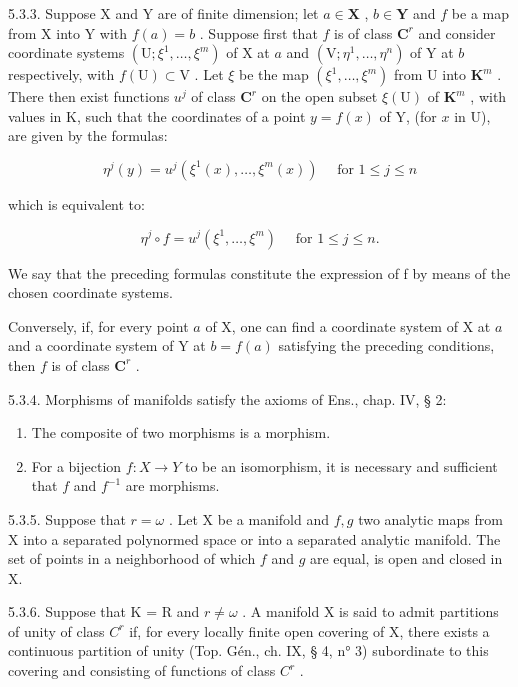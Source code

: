 5.3.3. Suppose X and Y are of finite dimension; let \(a \in \mathbf{X}\) , \(b \in \mathbf{Y}\) and \(f\) be a map from X into Y with \(f(a) = b\) . Suppose first that \(f\) is of class \(\mathbf{C}^r\) and consider coordinate systems \((\mathrm{U}; \xi^1, \ldots, \xi^m)\) of X at \(a\) and \((\mathrm{V}; \eta^1, \ldots, \eta^n)\) of Y at \(b\) respectively, with \(f(\mathrm{U}) \subset \mathrm{V}\) . Let \(\xi\) be the map \((\xi^1, \ldots, \xi^m)\) from U into \(\mathbf{K}^m\) . There then exist functions \(u^j\) of class \(\mathbf{C}^r\) on the open subset \(\xi(\mathrm{U})\) of \(\mathbf{K}^m\) , with values in K, such that the coordinates of a point \(y = f(x)\) of Y, (for \(x\) in U), are given by the formulas:

\[
\eta^ {j} (y) = u ^ {j} (\xi^ {1} (x), \dots , \xi^ {m} (x)) \quad \text { for } 1 \leqslant j \leqslant n\tag{1}
\]

which is equivalent to:

\[
\eta^ {j} \circ f = u ^ {j} (\xi^ {1}, \dots , \xi^ {m}) \quad \text { for } 1 \leqslant j \leqslant n.\tag{2}
\]

We say that the preceding formulas constitute the expression of f by means of the chosen coordinate systems.

Conversely, if, for every point \(a\) of X, one can find a coordinate system of X at \(a\) and a coordinate system of Y at \(b = f(a)\) satisfying the preceding conditions, then \(f\) is of class \(\mathbf{C}^{r}\) .

5.3.4. Morphisms of manifolds satisfy the axioms of Ens., chap. IV, § 2:

\begin{enumerate}
\def\labelenumi{\alph{enumi})}
\item
  The composite of two morphisms is a morphism.
\item
  For a bijection \(f:X\to Y\) to be an isomorphism, it is necessary and sufficient that \(f\) and \(f^{-1}\) are morphisms.
\end{enumerate}

5.3.5. Suppose that \(r = \omega\) . Let X be a manifold and \(f, g\) two analytic maps from X into a separated polynormed space or into a separated analytic manifold. The set of points in a neighborhood of which \(f\) and \(g\) are equal, is open and closed in X.

5.3.6. Suppose that K = R and \(r \neq \omega\) . A manifold X is said to admit partitions of unity of class \(C^{r}\) if, for every locally finite open covering of X, there exists a continuous partition of unity (Top. Gén., ch. IX, § 4, n° 3) subordinate to this covering and consisting of functions of class \(C^{r}\) .


